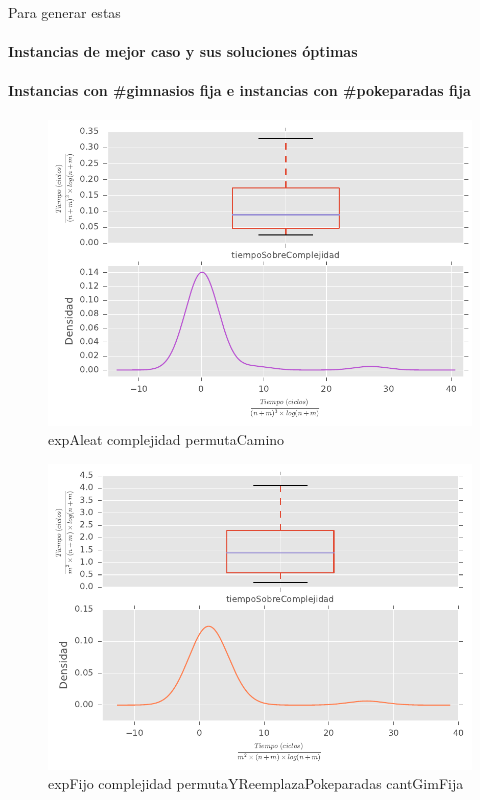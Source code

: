 Para generar estas

\paragraph{Instancias de mejor caso y sus soluciones \'optimas}

\paragraph{Instancias con \#gimnasios fija e instancias con \#pokeparadas fija}

\begin{figure}[H]
  \begin{center}
    \includegraphics{../experimentacion/ej3/expAleat_complejidad_permutaCamino.pdf}
    \caption{expAleat complejidad permutaCamino}
    \label{fig:expAleat_complejidad_permutaCamino}
  \end{center}
\end{figure}

\begin{figure}[H]
  \begin{center}
    \includegraphics{../experimentacion/ej3/expFijo_complejidad_permutaYReemplazaPokeparadas_cantGimFija.pdf}
    \caption{expFijo complejidad permutaYReemplazaPokeparadas cantGimFija}
    \label{fig:expFijo_complejidad_permutaYReemplazaPokeparadas_cantGimFija}
  \end{center}
\end{figure}

